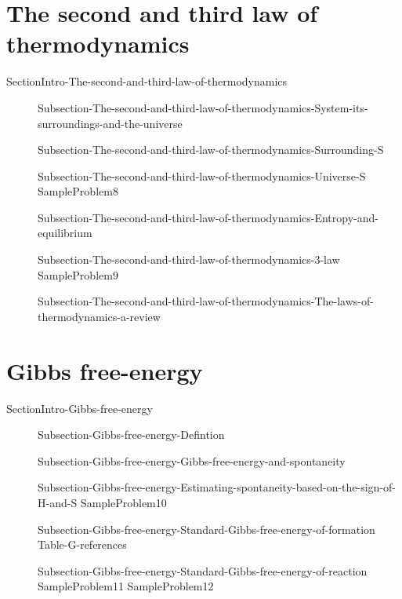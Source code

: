 \documentclass[main.tex]{subfiles}
\begin{document}
\section{The second and third law of thermodynamics}{SectionIntro-The-second-and-third-law-of-thermodynamics}
\sloppy\begin{description}
\item[] {Subsection-The-second-and-third-law-of-thermodynamics-System-its-surroundings-and-the-universe}
\item[] {Subsection-The-second-and-third-law-of-thermodynamics-Surrounding-S}
\item[] {Subsection-The-second-and-third-law-of-thermodynamics-Universe-S}
{SampleProblem8}
 \item[] {Subsection-The-second-and-third-law-of-thermodynamics-Entropy-and-equilibrium}
\item[] {Subsection-The-second-and-third-law-of-thermodynamics-3-law}
{SampleProblem9}
 \item[] {Subsection-The-second-and-third-law-of-thermodynamics-The-laws-of-thermodynamics-a-review}
\end{description}



\section{Gibbs free-energy}{SectionIntro-Gibbs-free-energy}
\sloppy\begin{description}
\item[] {Subsection-Gibbs-free-energy-Defintion}
\item[] {Subsection-Gibbs-free-energy-Gibbs-free-energy-and-spontaneity}
\item[]{Subsection-Gibbs-free-energy-Estimating-spontaneity-based-on-the-sign-of-H-and-S}
{SampleProblem10}
\item[] {Subsection-Gibbs-free-energy-Standard-Gibbs-free-energy-of-formation}
{Table-G-references}
\item[] {Subsection-Gibbs-free-energy-Standard-Gibbs-free-energy-of-reaction}
{SampleProblem11}
{SampleProblem12}
\end{description}
\end{document}
